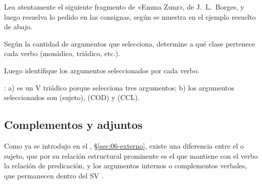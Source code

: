 \begin{ejercicio}\label{ej:07-valencia}
Lea atentamente el siguiente fragmento de «Emma Zunz», de J.~L.~Borges, y luego
resuelva lo pedido en las consignas, según se muestra en el ejemplo resuelto de
abajo.


\begin{consignas}
  \item Según la cantidad de argumentos que selecciona, determine a qué clase
        pertenece cada verbo (monádico, triádico, etc.).
  \item Luego identifique los argumentos seleccionados por cada verbo.
\end{consignas}

\begin{resuelto}
: a) es un V triádico porque selecciona tres argumentos; b) los
argumentos seleccionados son  (sujeto),  (COD) y  (CCL).
\end{resuelto}
\end{ejercicio}

\subsection{Complementos y adjuntos}\label{sec:07-compadj}

Como ya se introdujo en el , §\ref{sec:06-externo}, existe una
diferencia entre el  o sujeto, que por su relación
estructural prominente es el que mantiene con el verbo la relación de
predicación, y los argumentos internos o complementos verbales, que permanecen
dentro del SV \parencite{williams1980}.

